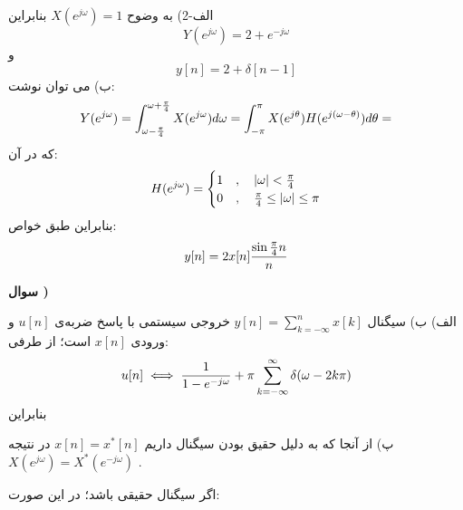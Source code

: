 \documentclass[10pt,letterpaper]{article}
\newcounter{QuestionNumber}
\newcommand{\Q}{
\textbf{
سوال \theQuestionNumber)
}
\stepcounter{QuestionNumber}
}
\begin{document}
الف-2) به وضوح
$
X(e^{j\omega})=1
$
 بنابراین
$$
Y(e^{j\omega})=2+e^{-j\omega}
$$
و
$$
y[n]=2+\delta[n-1]
$$
ب) می توان نوشت:
$$
Y(e^{j\omega})=\int_{\omega-{\pi\over 4}}^{\omega+{\pi\over 4}}X(e^{j\omega})d\omega=\int_{-\pi}^{\pi}X(e^{j\theta})H(e^{j(\omega-\theta)})d\theta=
$$
که در آن:
$$
H(e^{j\omega})=\begin{cases}
1&,\quad |\omega|<{\pi\over 4}\\
0&,\quad {\pi\over 4}\le|\omega|\le \pi
\end{cases}
$$
بنابراین طبق خواص:
$$
y[n]=2 x[n]{\sin{\pi\over 4}n\over n}
$$
\Q

الف)
ب) سیگنال 
$
y[n]=\sum_{k=-\infty}^{n}x[k]
$
 خروجی سیستمی با پاسخ ضربه‌ی $u[n]$ و ورودی $x[n]$ است؛ از طرفی:
$$
u[n]\iff{1\over 1-e^{-j\omega}}+\pi\sum_{k=-\infty}^{\infty}\delta(\omega-2k\pi)
$$
بنابراین

پ) 
از آنجا که به دلیل حقیق بودن سیگنال داریم
$
x[n]=x^*[n]
$
 در نتیجه 
$
X(e^{j\omega})=X^*(e^{-j\omega})
$
.

اگر سیگنال حقیقی باشد؛ در این صورت:
\end{document}
